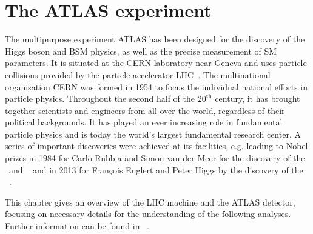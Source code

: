 \chapter{The ATLAS experiment}
\label{chap:atlas}
%
The multipurpose experiment \gls{ATLAS} has been designed for the discovery of the Higgs boson and \gls{BSM} physics, as well as the precise measurement of \gls{SM} parameters. It is situated at the \gls{CERN} laboratory near Geneva and uses particle collisions provided by the particle accelerator \gls{LHC}~\cite{1748-0221-3-08-S08001,LHCnew,LHCTDR}.
%
The multinational organisation \gls{CERN} was formed in 1954 to focus the individual national efforts in particle physics. Throughout the second half of the $20^\mathrm{th}$ century, it has brought together scientists and engineers from all over the world, regardless of their political backgrounds. It has played an ever increasing role in fundamental particle physics and is today the world's largest fundamental research center. A series of important discoveries were achieved at its facilities, e.g. leading to Nobel prizes in 1984 for Carlo Rubbia and Simon van der Meer for the discovery of the \Wbos\ and ~\cite{1983398} and in 2013 for Fran\c{c}ois Englert and Peter Higgs by the discovery of the \Hboson~\cite{Aad20121,Chatrchyan2013}.


This chapter gives an overview of the \gls{LHC} machine and the \gls{ATLAS} detector, focusing on necessary details for the understanding of the following analyses. Further information can be found in ~\cite{atlasexp}. 






